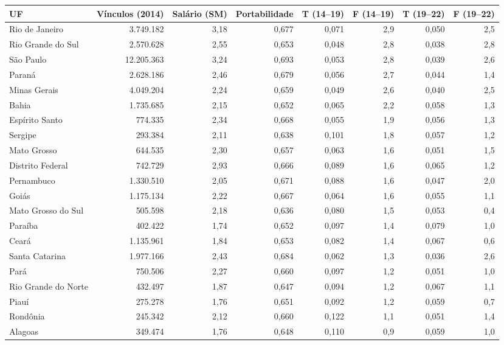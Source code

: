 \providecommand{\toprule}{\hline\hline}
\providecommand{\midrule}{\hline}
\providecommand{\bottomrule}{\hline\hline}
\providecommand{\addlinespace}[1][]{}
{\small
\renewcommand{\arraystretch}{1.12}
\begin{tabular}{lrrrrrrr}
\toprule
UF & Vínculos (2014) & Salário (SM) & Portabilidade & T (14–19) & F (14–19) & T (19–22) & F (19–22) \\
\midrule
Rio de Janeiro & 3.749.182 & 3,18 & 0,677 & 0,071 & 2,9 & 0,050 & 2,5 \\
Rio Grande do Sul & 2.570.628 & 2,55 & 0,653 & 0,048 & 2,8 & 0,038 & 2,8 \\
São Paulo & 12.205.363 & 3,24 & 0,693 & 0,053 & 2,8 & 0,039 & 2,6 \\
Paraná & 2.628.186 & 2,46 & 0,679 & 0,056 & 2,7 & 0,044 & 1,4 \\
Minas Gerais & 4.049.204 & 2,24 & 0,659 & 0,049 & 2,6 & 0,040 & 2,5 \\
Bahia & 1.735.685 & 2,15 & 0,652 & 0,065 & 2,2 & 0,058 & 1,3 \\
Espírito Santo & 774.335 & 2,34 & 0,668 & 0,055 & 1,9 & 0,056 & 1,3 \\
Sergipe & 293.384 & 2,11 & 0,638 & 0,101 & 1,8 & 0,057 & 1,2 \\
Mato Grosso & 644.535 & 2,30 & 0,657 & 0,063 & 1,6 & 0,051 & 1,5 \\
Distrito Federal & 742.729 & 2,93 & 0,666 & 0,089 & 1,6 & 0,065 & 1,2 \\
Pernambuco & 1.330.510 & 2,05 & 0,671 & 0,088 & 1,6 & 0,047 & 2,0 \\
Goiás & 1.175.134 & 2,22 & 0,667 & 0,064 & 1,6 & 0,055 & 1,1 \\
Mato Grosso do Sul & 505.598 & 2,18 & 0,636 & 0,080 & 1,5 & 0,053 & 0,4 \\
Paraíba & 402.422 & 1,74 & 0,652 & 0,097 & 1,4 & 0,079 & 1,0 \\
Ceará & 1.135.961 & 1,84 & 0,653 & 0,082 & 1,4 & 0,067 & 0,6 \\
Santa Catarina & 1.977.166 & 2,43 & 0,684 & 0,062 & 1,3 & 0,036 & 2,6 \\
Pará & 750.506 & 2,27 & 0,660 & 0,097 & 1,2 & 0,051 & 1,0 \\
Rio Grande do Norte & 432.497 & 1,87 & 0,647 & 0,094 & 1,2 & 0,067 & 1,1 \\
Piauí & 275.278 & 1,76 & 0,651 & 0,092 & 1,2 & 0,059 & 0,7 \\
Rondônia & 245.342 & 2,12 & 0,660 & 0,122 & 1,1 & 0,051 & 1,4 \\
Alagoas & 349.474 & 1,76 & 0,648 & 0,110 & 0,9 & 0,059 & 1,0 \\

\end{tabular}}
